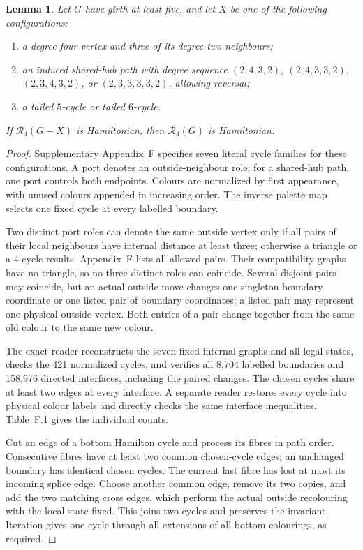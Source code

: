 \documentclass[11pt]{article}
\newtheorem{lemma}[theorem]{Lemma}
\theoremstyle{remark}
\newcommand{\R}{\mathcal R}
\numberwithin{equation}{section}
\numberwithin{table}{section}
\begin{document}
\begin{lemma}\label{lem:further-degree-two}
Let $G$ have girth at least five, and let $X$ be one of the following
configurations:
\begin{enumerate}
\item a degree-four vertex and three of its degree-two neighbours;
\item an induced shared-hub path with degree sequence
$(2,4,3,2)$, $(2,4,3,3,2)$, $(2,3,4,3,2)$, or
$(2,3,3,3,3,2)$, allowing reversal;
\item a tailed $5$-cycle or tailed $6$-cycle.
\end{enumerate}
If $\R_4(G-X)$ is Hamiltonian, then $\R_4(G)$ is Hamiltonian.
\end{lemma}
\begin{proof}
Supplementary Appendix~F specifies seven literal cycle families for these
configurations. A port denotes an outside-neighbour role; for a shared-hub
path, one port controls both endpoints. Colours are normalized by first
appearance, with unused colours appended in increasing order. The inverse
palette map selects one fixed cycle at every labelled boundary.

Two distinct port roles can denote the same outside vertex only if all
pairs of their local neighbours have internal distance at least three;
otherwise a triangle or a $4$-cycle results. Appendix~F lists all allowed
pairs. Their compatibility graphs have no triangle, so no three distinct
roles can coincide. Several disjoint pairs may coincide, but an actual
outside move changes one singleton boundary coordinate or one listed pair of
boundary coordinates; a listed pair may represent one physical outside
vertex. Both entries of a pair change together from the same old colour to the
same new colour.

The exact reader reconstructs the seven fixed internal graphs and all legal
states, checks the 421 normalized cycles, and verifies all 8,704 labelled
boundaries and 158,976 directed interfaces, including the paired changes.
The chosen cycles share at least two edges at every interface. A separate
reader restores every cycle into physical colour labels and directly checks
the same interface inequalities. Table~F.1 gives the individual counts.

Cut an edge of a bottom Hamilton cycle and process its fibres in path
order. Consecutive fibres have at least two common chosen-cycle edges;
an unchanged boundary has identical chosen cycles. The current last fibre
has lost at most its incoming splice edge. Choose another common edge,
remove its two copies, and add the two matching cross edges, which perform
the actual outside recolouring with the local state fixed. This joins two
cycles and preserves the invariant. Iteration gives one cycle through all
extensions of all bottom colourings, as required.
\end{proof}
\end{document}
